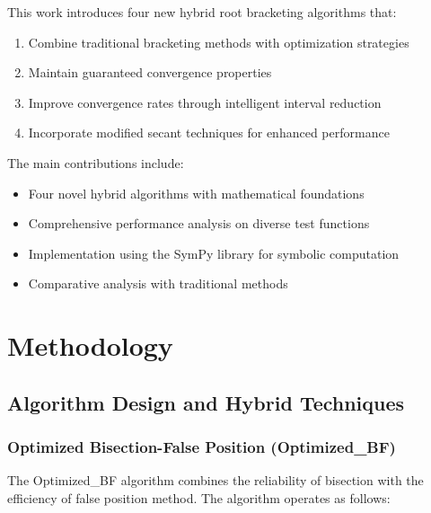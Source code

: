 \documentclass[11pt,a4paper]{article}
\begin{document}
This work introduces four new hybrid root bracketing algorithms that:

\begin{enumerate}
    \item Combine traditional bracketing methods with optimization strategies
    \item Maintain guaranteed convergence properties
    \item Improve convergence rates through intelligent interval reduction
    \item Incorporate modified secant techniques for enhanced performance
\end{enumerate}

The main contributions include:
\begin{itemize}
    \item Four novel hybrid algorithms with mathematical foundations
    \item Comprehensive performance analysis on diverse test functions
    \item Implementation using the SymPy library for symbolic computation
    \item Comparative analysis with traditional methods
\end{itemize}

\section{Methodology}

\subsection{Algorithm Design and Hybrid Techniques}

\subsubsection{Optimized Bisection-False Position (Optimized\_BF)}

The Optimized\_BF algorithm combines the reliability of bisection with the efficiency of false position method. The algorithm operates as follows:
\end{document}
